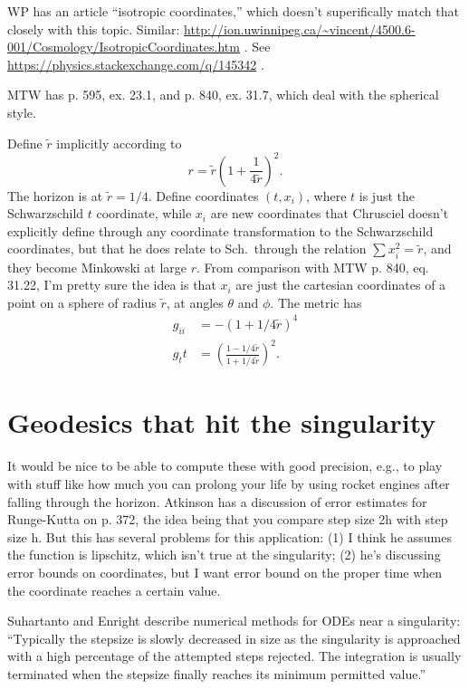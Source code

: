 \documentclass{article}
\begin{document}
WP has an article ``isotropic coordinates,'' which doesn't superifically match that
closely with this topic. 
Similar: \url{http://ion.uwinnipeg.ca/~vincent/4500.6-001/Cosmology/IsotropicCoordinates.htm} .
See \url{https://physics.stackexchange.com/q/145342} .

MTW has p. 595, ex. 23.1, and p. 840, ex. 31.7, which deal with the spherical style.

Define $\tilde{r}$ implicitly according to
\begin{equation}
  r = \tilde{r}\left(1+\frac{1}{4\tilde{r}}\right)^2.
\end{equation}
The horizon is at $\tilde{r}=1/4$. Define coordinates $(t,x_i)$, where $t$ is
just the Schwarzschild $t$ coordinate, while $x_i$ are new coordinates that Chrusciel doesn't
explicitly define through any coordinate transformation to the Schwarzschild coordinates,
but that he does relate to Sch.~through the relation $\sum x_i^2=\tilde{r}$, and they
become Minkowski at large $r$. From comparison with MTW p. 840, eq. 31.22, I'm pretty
sure the idea is that $x_i$ are just the cartesian coordinates of a point on a sphere
of radius $\tilde{r}$, at angles $\theta$ and $\phi$. The metric has
\begin{align}
  g_{ii} &= -(1+1/4\tilde{r})^4 \\
  g_tt &= \left(\frac{1-1/4\tilde{r}}{1+1/4\tilde{r}}\right)^2.
\end{align}

\section{Geodesics that hit the singularity}

It would be nice to be able to compute these with good precision, e.g., to play with
stuff like how much you can prolong your life by using rocket engines after falling
through the horizon. Atkinson has a discussion of error estimates for Runge-Kutta on
p. 372, the idea being that you compare step size 2h with step size h. But this has
several problems for this application: (1) I think he assumes the function is lipschitz,
which isn't true at the singularity; (2) he's discussing error bounds on coordinates,
but I want error bound on the proper time when the coordinate reaches a certain value.

Suhartanto and Enright describe numerical methods for ODEs near a singularity:
``Typically
the stepsize is slowly decreased in size as the singularity is
approached with a high percentage of the attempted steps rejected.
The integration is usually terminated when the stepsize finally
reaches its minimum permitted value.''
\end{document}
